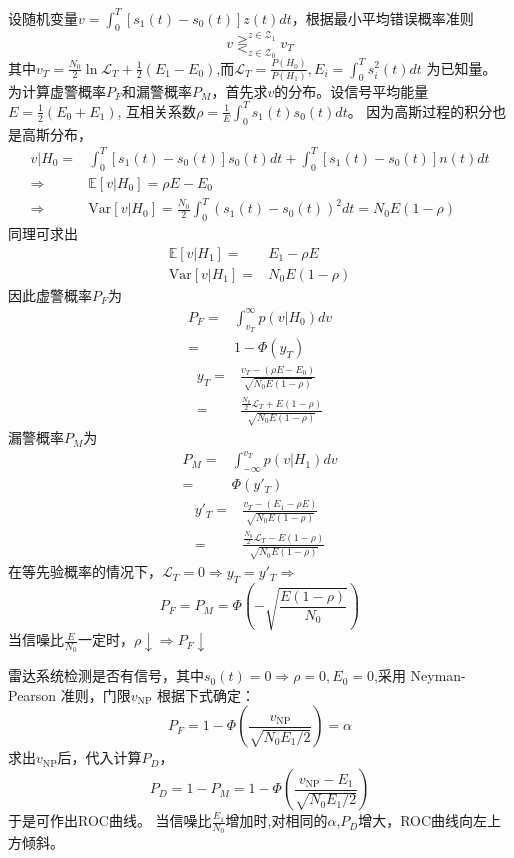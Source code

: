 \documentclass{article}
\def\E{\mathbb{E}}
\def\Var{\textrm{Var}}
\begin{document}
\begin{enumerate}
设随机变量$v=\int_0^T [s_1(t)-s_0(t)]z(t)dt$，根据最小平均错误概率准则
\begin{equation}\label{eq:continuous_judge}
v \mathop{\gtreqless}^{z\in \mathcal{Z}_1}_{z \in \mathcal{Z}_0} v_T
\end{equation}
其中$v_T=\frac{N_0}{2}\ln \mathscr{L}_T+\frac{1}{2}(E_1-E_0)$,而$\mathscr{L}_T=\frac{P(H_0)}{P(H_1)},E_i=\int_0^T s_i^2(t)dt$ 为已知量。
为计算虚警概率$P_F$和漏警概率$P_M$，首先求$v$的分布。设信号平均能量$E=\frac{1}{2}(E_0+E_1)$, 互相关系数$\rho=\frac{1}{E}\int_0^T s_1(t)s_0(t)dt$。
因为高斯过程的积分也是高斯分布，
\begin{align*}
v|H_0 = & \int_0^T [s_1(t)-s_0(t)]s_0(t)dt+\int_0^T [s_1(t)-s_0(t)]n(t)dt \\
\Rightarrow & \E[v|H_0]=\rho E-E_0 \\
\Rightarrow & \Var[v|H_0]=\frac{N_0}{2}\int_0^T (s_1(t)-s_0(t))^2dt=N_0 E(1-\rho)
\end{align*}
同理可求出
\begin{align*}
\E[v|H_1]    = & E_1 - \rho E \\
\Var[v|H_1]  = & N_0 E(1-\rho)
\end{align*}
因此虚警概率$P_F$为
\begin{align*}
P_F = & \int_{v_T}^{\infty} p(v|H_0)dv \\
    = & 1-\Phi(y_T)
\end{align*}
\begin{align*}
y_T = & \frac{v_T-(\rho E-E_0)}{\sqrt{N_0 E(1-\rho)}} \\
    = & \frac{\frac{N_0}{2}\mathscr{L}_T+E(1-\rho)}{\sqrt{N_0 E(1-\rho)}}
\end{align*}
漏警概率$P_M$为
\begin{align*}
P_M = & \int_{-\infty}^{v_T} p(v|H_1)dv \\
    = & \Phi(y'_T)
\end{align*}
\begin{align*}
y'_T = & \frac{v_T-(E_1-\rho E)}{\sqrt{N_0 E(1-\rho)}} \\
    = & \frac{\frac{N_0}{2}\mathscr{L}_T-E(1-\rho)}{\sqrt{N_0 E(1-\rho)}}
\end{align*}
在等先验概率的情况下，$\mathscr{L}_T=0\Rightarrow y_T=y'_T\Rightarrow $
\begin{equation}\label{eq:continuous_eq_prob}
P_F=P_M=\Phi(-\sqrt{\frac{E(1-\rho)}{N_0}})
\end{equation}
当信噪比$\frac{E}{N_0}$一定时，$\rho \downarrow \Rightarrow P_F\downarrow$

雷达系统检测是否有信号，其中$s_0(t)=0 \Rightarrow \rho=0,E_0=0$,采用 Neyman-Pearson 准则，门限$v_{\textrm{NP}}$ 根据下式确定：
$$
P_F = 1-\Phi(\frac{v_{\textrm{NP}}}{\sqrt{N_0 E_1/2}})=\alpha 
$$
求出$v_{\textrm{NP}}$后，代入计算$P_D$，
$$
P_D=1-P_M=1-\Phi(\frac{v_{\textrm{NP}}-E_1}{\sqrt{N_0 E_1/2}})
$$
于是可作出ROC曲线。
当信噪比$\frac{E_1}{N_0}$增加时,对相同的$\alpha$,$P_D$增大，ROC曲线向左上方倾斜。


\end{enumerate}
\end{document}
